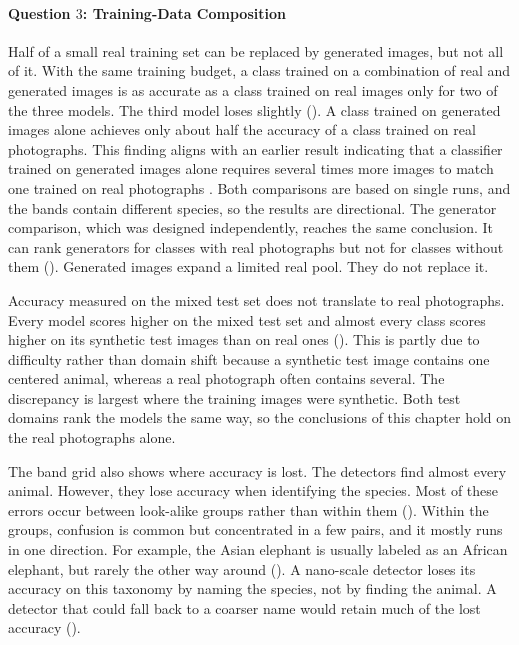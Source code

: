 \paragraph{Question $3$: Training-Data Composition}
Half of a small real training set can be replaced by generated images, but not all of it. With the same training budget, a class trained on a combination of real and generated images is as accurate as a class trained on real images only for two of the three models. The third model loses slightly (). A class trained on generated images alone achieves only about half the accuracy of a class trained on real photographs. This finding aligns with an earlier result indicating that a classifier trained on generated images alone requires several times more images to match one trained on real photographs \cite{heSyntheticDataGenerative2023}. Both comparisons are based on single runs, and the bands contain different species, so the results are directional. The generator comparison, which was designed independently, reaches the same conclusion. It can rank generators for classes with real photographs but not for classes without them (). Generated images expand a limited real pool. They do not replace it.

Accuracy measured on the mixed test set does not translate to real photographs. Every model scores higher on the mixed test set and almost every class scores higher on its synthetic test images than on real ones (). This is partly due to difficulty rather than domain shift because a synthetic test image contains one centered animal, whereas a real photograph often contains several. The discrepancy is largest where the training images were synthetic. Both test domains rank the models the same way, so the conclusions of this chapter hold on the real photographs alone.

The band grid also shows where accuracy is lost. The detectors find almost every animal. However, they lose accuracy when identifying the species. Most of these errors occur between look-alike groups rather than within them (). Within the groups, confusion is common but concentrated in a few pairs, and it mostly runs in one direction. For example, the Asian elephant is usually labeled as an African elephant, but rarely the other way around (). A nano-scale detector loses its accuracy on this taxonomy by naming the species, not by finding the animal. A detector that could fall back to a coarser name would retain much of the lost accuracy ().

